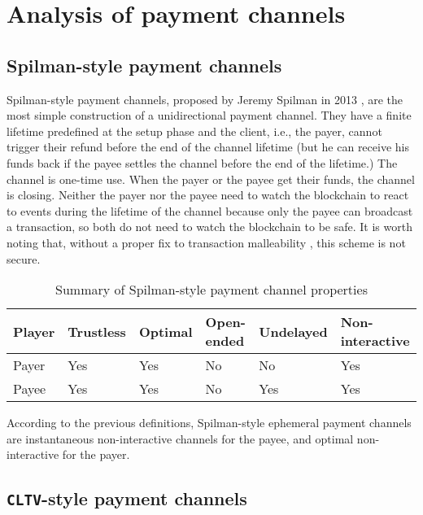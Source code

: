 \documentclass{llncs}
\begin{document}
\section{Analysis of payment channels}

\subsection{Spilman-style payment channels}

Spilman-style payment channels, proposed by Jeremy Spilman in 2013 \cite{SpilmanStyle}, are the most simple construction of a unidirectional payment channel. They have a finite lifetime predefined at the setup phase and the client, i.e., the payer, cannot trigger their refund before the end of the channel lifetime (but he can receive his funds back if the payee settles the channel before the end of the lifetime.) The channel is one-time use. When the payer or the payee get their funds, the channel is closing. Neither the payer nor the payee need to watch the blockchain to react to events during the lifetime of the channel because only the payee can broadcast a transaction, so both do not need to watch the blockchain to be safe. It is worth noting that, without a proper fix to transaction malleability \cite{SegWitBIP, BIP62, DBLP:journals/corr/AndrychowiczDMM13, DBLP:journals/corr/DeckerW14}, this scheme is not secure.

\begin{table}[h]
  \begin{tabularx}{\textwidth}{ | X | l | l | l | l | l |}
  \hline
  Player & Trustless & Optimal & Open-ended & Undelayed & Non-interactive \\
  \hline \hline
  Payer & Yes & Yes & No & No & Yes \\ \hline
  Payee & Yes & Yes & No & Yes & Yes \\
  \hline
  \end{tabularx}
  \caption{Summary of Spilman-style payment channel properties}
  \label{fig:summarySpilmanPaymentChannel}
\end{table}

According to the previous definitions, Spilman-style ephemeral payment channels are instantaneous non-interactive channels for the payee, and optimal non-interactive for the payer.

\subsection{\texttt{CLTV}-style payment channels}
\end{document}
